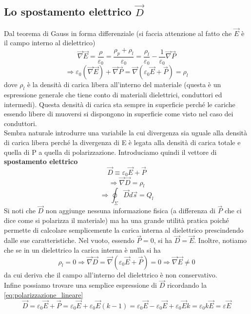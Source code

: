 \documentclass[10pt,a4paper]{article}
\begin{document}
\subsection{Lo spostamento elettrico $\vec{D}$}
Dal teorema di Gauss in forma differenziale (si faccia attenzione al fatto che $\vec{E}$ è il campo interno al dielettrico)
\[\vec{\nabla}\vec{E} = \frac{\rho}{\varepsilon_0} = \frac{\rho_p + \rho_l}{\varepsilon_0} = \frac{\rho_l}{\varepsilon_0}-\frac{1}{\varepsilon_0}\vec{\nabla}\vec{P}\]
\[\Rightarrow \varepsilon_0(\vec{\nabla}\vec{E})+\vec{\nabla}\vec{P} = \vec{\nabla}(\varepsilon_0\vec{E}+\vec{P})= \rho_l\]
dove $\rho_l$ è la densità di carica libera all'interno del materiale (questa è un espressione generale che tiene conto di materiali dielettrici, conduttori ed intermedi). Questa densità di carica sta sempre in superficie perché le cariche essendo libere di muoversi si dispongono in superficie come visto nel caso dei conduttori.\\
Sembra naturale introdurre una variabile la cui divergenza sia uguale alla densità di carica libera perché la divergenza di E è legata alla densità di carica totale e quella di P a quella di polarizzazione. Introduciamo quindi il vettore di \textbf{spostamento elettrico}
\[\vec{D} \equiv \varepsilon_0\vec{E}+\vec{P}\]
\[\Rightarrow \vec{\nabla}\vec{D} =\rho_l\]
\[\Rightarrow \oint_\Sigma\vec{D}d\vec{s} = Q_l\]
Si noti che $\vec{D}$ non aggiunge nessuna informazione fisica (a differenza di $\vec{P}$ che ci dice come si polarizza il materiale) ma ha una grande utilità pratica poiché permette di calcolare semplicemente la carica interna al dielettrico prescindendo dalle sue caratteristiche. Nel vuoto, essendo $\vec{P} = 0$, si ha $\vec{D} = \vec{E}$. Inoltre, notiamo che se in un dielettrico la carica interna è nulla si ha
\[\rho_l = 0 \Rightarrow \vec{\nabla}\vec{D} =\vec{\nabla}(\varepsilon_0\vec{E}+\vec{P}) = 0 \Rightarrow \vec{\nabla}\vec{E}\neq 0\]
da cui deriva che il campo all'interno del dielettrico è non conservativo.\\
Infine possiamo trovare una semplice espressione di $\vec{D}$ ricordando la \ref{eq:polarizzazione_lineare}
\[\vec{D} = \varepsilon_0\vec{E}+\vec{P} = \varepsilon_0\vec{E}+ \varepsilon_0 \vec{E}(k-1)=  \varepsilon_0\vec{E}- \varepsilon_0 \vec{E}+\varepsilon_0 \vec{E}k=\varepsilon_0 k\vec{E} = \varepsilon \vec{E}\]
\end{document}
